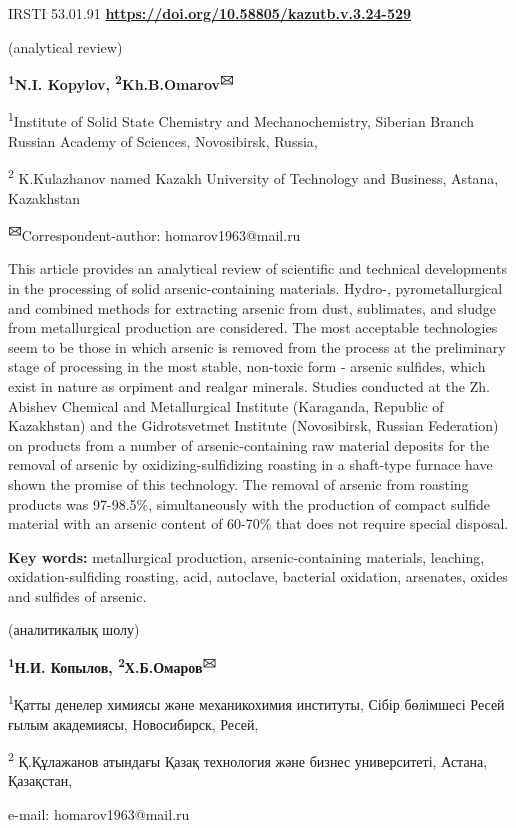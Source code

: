 \newpage
IRSTI 53.01.91
\hfill {\bfseries \href{https://doi.org/10.58805/kazutb.v.3.24-529}{https://doi.org/10.58805/kazutb.v.3.24-529}}


\begin{center}
(analytical review)

{\bfseries \textsuperscript{1}N.I. Kopylov,
\textsuperscript{2}Kh.B.Omarov\textsuperscript{🖂}}

\textsuperscript{1}Institute of Solid State Chemistry and
Mechanochemistry, Siberian Branch Russian Academy of Sciences,
Novosibirsk, Russia,

\textsuperscript{2} K.Kulazhanov named Kazakh University of Technology
and Business, Astana, Kazakhstan
\end{center}

{\bfseries \textsuperscript{🖂}}Correspondent-author: homarov1963@mail.ru

This article provides an analytical review of scientific and technical
developments in the processing of solid arsenic-containing materials.
Hydro-, pyrometallurgical and combined methods for extracting arsenic
from dust, sublimates, and sludge from metallurgical production are
considered. The most acceptable technologies seem to be those in which
arsenic is removed from the process at the preliminary stage of
processing in the most stable, non-toxic form - arsenic sulfides, which
exist in nature as orpiment and realgar minerals. Studies conducted at
the Zh. Abishev Chemical and Metallurgical Institute (Karaganda,
Republic of Kazakhstan) and the Gidrotsvetmet Institute (Novosibirsk,
Russian Federation) on products from a number of arsenic-containing raw
material deposits for the removal of arsenic by oxidizing-sulfidizing
roasting in a shaft-type furnace have shown the promise of this
technology. The removal of arsenic from roasting products was 97-98.5\%,
simultaneously with the production of compact sulfide material with an
arsenic content of 60-70\% that does not require special disposal.

{\bfseries Key words:} metallurgical production, arsenic-containing
materials, leaching, oxidation-sulfiding roasting, acid, autoclave,
bacterial oxidation, arsenates, oxides and sulfides of arsenic.


\begin{center}
(аналитикалық шолу)

{\bfseries \textsuperscript{1}Н.И. Копылов,
\textsuperscript{2}Х.Б.Омаров\textsuperscript{🖂}}

\textsuperscript{1}Қатты денелер химиясы және механикохимия институты,
Сібір бөлімшесі Ресей ғылым академиясы, Новосибирск, Ресей,

\textsuperscript{2} Қ.Құлажанов атындағы Қазақ технология және бизнес
университеті, Астана, Қазақстан,

e-mail: homarov1963@mail.ru
\end{center}

